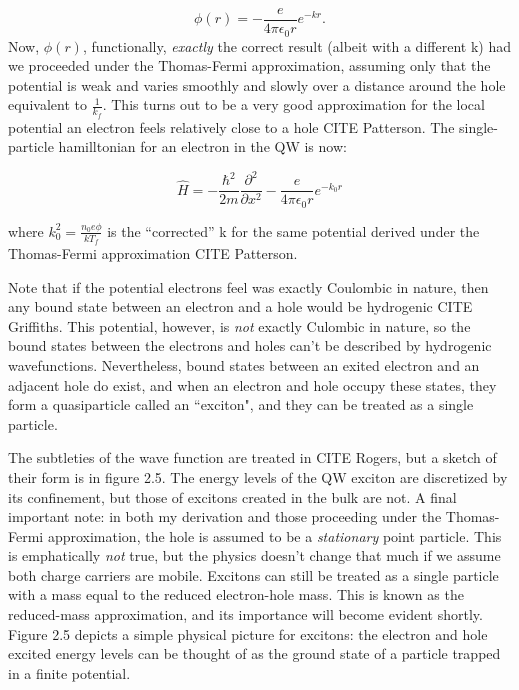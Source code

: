 \begin{equation}
\phi(r) = -\frac{e}{4\pi \epsilon_0 r} e^{-k r}.
\end{equation}
\indent Now, $\phi(r)$, functionally, \textit{exactly} the correct result (albeit with a different k) had we proceeded under the Thomas-Fermi approximation, assuming only that the potential is weak and varies smoothly and slowly over a distance around the hole equivalent to $\frac{1}{k_f}$. This turns out to be a very good approximation for the local potential an electron feels relatively close to a hole CITE Patterson. The single-particle hamilltonian for an electron in the QW is now:

\begin{equation}
\hat{H} = - \frac{\hbar^2}{2m} \frac{\partial^2}{\partial x^2} - \frac{e}{4\pi \epsilon_0 r} e^{-k_0 r}
\end{equation}

where $k_0^2 = \frac{n_0 e\phi}{k T_f}$ is the ``corrected'' k for the same potential derived under the Thomas-Fermi approximation CITE Patterson. 

\indent Note that if the potential electrons feel was exactly Coulombic in nature, then any bound state between an electron and a hole would be hydrogenic CITE Griffiths. This potential, however, is \textit{not} exactly Culombic in nature, so the bound states between the electrons and holes can't be described by hydrogenic wavefunctions. Nevertheless, bound states between an exited electron and an adjacent hole do exist, and when an electron and hole occupy these states, they form a quasiparticle called an ``exciton", and they can be treated as a single particle.

\indent The subtleties of the wave function are treated in CITE Rogers, but a sketch of their form is in figure 2.5. The energy levels of the QW exciton are discretized by its confinement, but those of excitons created in the bulk are not. A final important note: in both my derivation and those proceeding under the Thomas-Fermi approximation, the hole is assumed to be a \textit{stationary} point particle. This is emphatically \textit{not} true, but the physics doesn't change that much if we assume both charge carriers are mobile. Excitons can still be treated as a single particle with a mass equal to the reduced electron-hole mass. This is known as the reduced-mass approximation, and its importance will become evident shortly. Figure 2.5 depicts a simple physical picture for excitons: the electron and hole excited energy levels can be thought of as the ground state of a particle trapped in a finite potential.  

